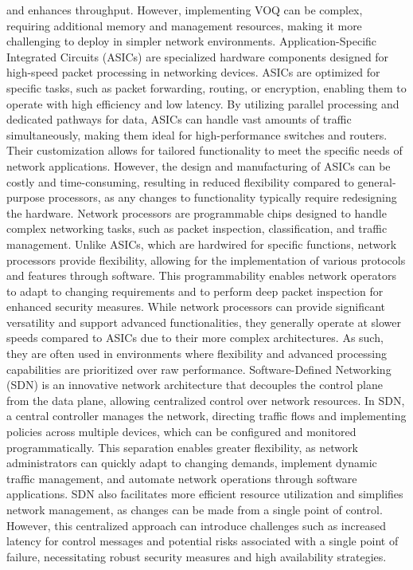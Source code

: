 \documentclass{article}
\begin{document}
and enhances throughput. However, implementing VOQ can be complex, requiring additional memory and management resources, making it more challenging to deploy in simpler network environments. Application-Specific Integrated Circuits (ASICs) are specialized hardware components designed for high-speed packet processing in networking devices. ASICs are optimized for specific tasks, such as packet forwarding, routing, or encryption, enabling them to operate with high efficiency and low latency. By utilizing parallel processing and dedicated pathways for data, ASICs can handle vast amounts of traffic simultaneously, making them ideal for high-performance switches and routers. Their customization allows for tailored functionality to meet the specific needs of network applications. However, the design and manufacturing of ASICs can be costly and time-consuming, resulting in reduced flexibility compared to general-purpose processors, as any changes to functionality typically require redesigning the hardware. Network processors are programmable chips designed to handle complex networking tasks, such as packet inspection, classification, and traffic management. Unlike ASICs, which are hardwired for specific functions, network processors provide flexibility, allowing for the implementation of various protocols and features through software. This programmability enables network operators to adapt to changing requirements and to perform deep packet inspection for enhanced security measures. While network processors can provide significant versatility and support advanced functionalities, they generally operate at slower speeds compared to ASICs due to their more complex architectures. As such, they are often used in environments where flexibility and advanced processing capabilities are prioritized over raw performance. Software-Defined Networking (SDN) is an innovative network architecture that decouples the control plane from the data plane, allowing centralized control over network resources. In SDN, a central controller manages the network, directing traffic flows and implementing policies across multiple devices, which can be configured and monitored programmatically. This separation enables greater flexibility, as network administrators can quickly adapt to changing demands, implement dynamic traffic management, and automate network operations through software applications. SDN also facilitates more efficient resource utilization and simplifies network management, as changes can be made from a single point of control. However, this centralized approach can introduce challenges such as increased latency for control messages and potential risks associated with a single point of failure, necessitating robust security measures and high availability strategies.\\
\end{document}
